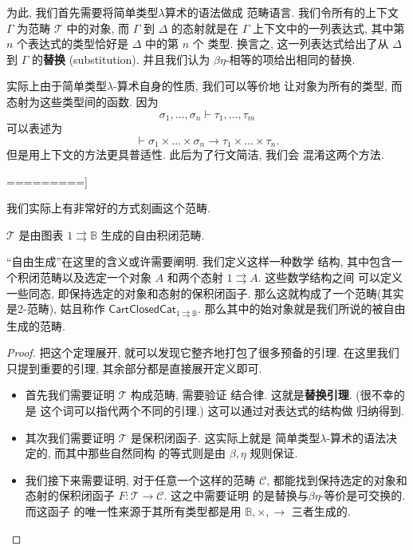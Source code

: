为此, 我们首先需要将简单类型\(\lambda\)算术的语法做成
范畴语言. 我们令所有的上下文 \(\Gamma\) 为范畴
\(\mathcal T\) 中的对象, 而 \(\Gamma\) 到 \(\Delta\)
的态射就是在 \(\Gamma\) 上下文中的一列表达式, 其中第
\(n\) 个表达式的类型恰好是 \(\Delta\) 中的第 \(n\) 个
类型. 换言之, 这一列表达式给出了从 \(\Delta\) 到 \(\Gamma\)
的\textbf{替换} (substitution). 并且我们认为
\(\beta\eta\)-相等的项给出相同的替换.

实际上由于简单类型\(\lambda\)-算术自身的性质, 我们可以等价地
让对象为所有的类型, 而态射为这些类型间的函数. 因为
\[\sigma_1,\dots,\sigma_n \vdash \tau_1,\dots,\tau_m\]
可以表述为
\[\vdash \sigma_1\times\dots\times\sigma_n \to \tau_1 \times\dots\times\tau_n.\]
但是用上下文的方法更具普适性. 此后为了行文简洁, 我们会
混淆这两个方法.


=========]

我们实际上有非常好的方式刻画这个范畴.
\begin{theorem}
\(\mathcal T\) 是由图表 \(1 \rightrightarrows \mathbb B\)
生成的自由积闭范畴.
\end{theorem}
``自由生成''在这里的含义或许需要阐明. 我们定义这样一种数学
结构, 其中包含一个积闭范畴以及选定一个对象 \(A\)
和两个态射 \(1\rightrightarrows A\). 这些数学结构之间
可以定义一些同态, 即保持选定的对象和态射的保积闭函子.
那么这就构成了一个范畴(其实是2-范畴), 姑且称作
\(\mathsf{CartClosedCat}_{1\rightrightarrows\mathbb B}\).
那么其中的始对象就是我们所说的被自由生成的范畴.

\begin{proof}
把这个定理展开, 就可以发现它整齐地打包了很多预备的引理.
在这里我们只提到重要的引理, 其余部分都是直接展开定义即可.
\begin{itemize}
\item 首先我们需要证明 \(\mathcal T\) 构成范畴, 需要验证
结合律. 这就是\textbf{替换引理}. (很不幸的是
这个词可以指代两个不同的引理.) 这可以通过对表达式的结构做
归纳得到.
\item 其次我们需要证明 \(\mathcal T\) 是保积闭函子. 这实际上就是
简单类型\(\lambda\)-算术的语法决定的, 而其中那些自然同构
的等式则是由 \(\beta,\eta\) 规则保证.
\item 我们接下来需要证明, 对于任意一个这样的范畴 \(\mathcal C\),
都能找到保持选定的对象和态射的保积闭函子
\(F : \mathcal T \to \mathcal C\). 这之中需要证明
的是替换与\(\beta\eta\)-等价是可交换的. 而这函子
的唯一性来源于其所有类型都是用
\(\mathbb B, \times, \to\) 三者生成的.\qedhere
\end{itemize}
\end{proof}

